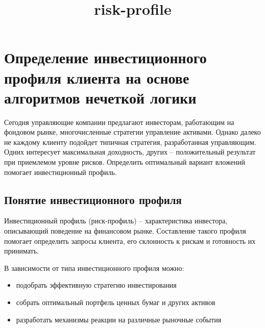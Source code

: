 \documentclass[11pt]{article}
\title{risk-profile}
\providecommand{\tightlist}{%
      \setlength{\itemsep}{0pt}\setlength{\parskip}{0pt}}
\begin{document}
    
    \maketitle
    
    

    
    \section{Определение инвестиционного профиля клиента на основе
алгоритмов нечеткой
логики}\label{ux43eux43fux440ux435ux434ux435ux43bux435ux43dux438ux435-ux438ux43dux432ux435ux441ux442ux438ux446ux438ux43eux43dux43dux43eux433ux43e-ux43fux440ux43eux444ux438ux43bux44f-ux43aux43bux438ux435ux43dux442ux430-ux43dux430-ux43eux441ux43dux43eux432ux435-ux430ux43bux433ux43eux440ux438ux442ux43cux43eux432-ux43dux435ux447ux435ux442ux43aux43eux439-ux43bux43eux433ux438ux43aux438}

Сегодня управляющие компании предлагают инвесторам, работающим на
фондовом рынке, многочисленные стратегии управление активами. Однако
далеко не каждому клиенту подойдет типичная стратегия, разработанная
управляющим. Одних интересует максимальная доходность, других --
положительный результат при приемлемом уровне рисков. Определить
оптимальный вариант вложений помогает инвестиционный профиль.

\subsection{Понятие инвестиционного
профиля}\label{ux43fux43eux43dux44fux442ux438ux435-ux438ux43dux432ux435ux441ux442ux438ux446ux438ux43eux43dux43dux43eux433ux43e-ux43fux440ux43eux444ux438ux43bux44f}

Инвестиционный профиль (риск-профиль) -- характеристика инвестора,
описывающий поведение на финансовом рынке. Составление такого профиля
помогает определить запросы клиента, его склонность к рискам и
готовность их принимать.

В зависимости от типа инвестиционного профиля можно:

\begin{itemize}
\tightlist
\item
  подобрать эффективную стратегию инвестирования
\item
  собрать оптимальный портфель ценных бумаг и других активов
\item
  разработать механизмы реакции на различные рыночные события
\end{itemize}
\end{document}
